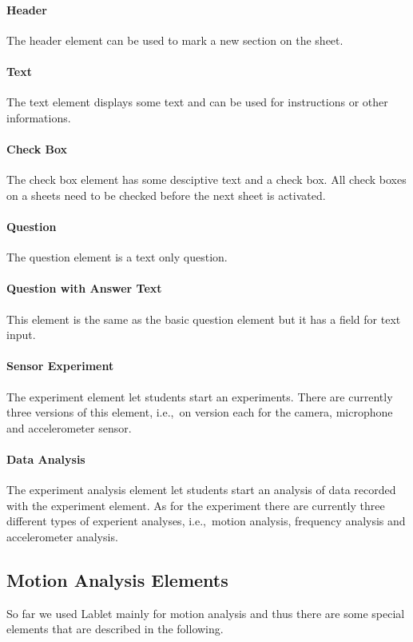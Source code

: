 \documentclass{sigchi}
\newcommand{\ie}{i.e.,\ }
\begin{document}
\paragraph{Header}
The header element can be used to mark a new section on the sheet.

\paragraph{Text}
The text element displays some text and can be used for instructions
or other informations.

\paragraph{Check Box}
The check box element has some desciptive text and a check box.  All
check boxes on a sheets need to be checked before the next sheet is
activated.

\paragraph{Question}
The question element is a text only question.

\paragraph{Question with Answer Text}
This element is the same as the basic question element but it has a
field for text input.

\paragraph{Sensor Experiment}
The experiment element let students start an experiments.  There are
currently three versions of this element, \ie on version each for the
camera, microphone and accelerometer sensor.

\paragraph{Data Analysis}
The experiment analysis element let students start an analysis of data
recorded with the experiment element.  As for the experiment there are
currently three different types of experient analyses, \ie motion
analysis, frequency analysis and accelerometer analysis.

\subsection{Motion Analysis Elements}
So far we used Lablet mainly for motion analysis and thus there are
some special elements that are described in the following.
\end{document}
